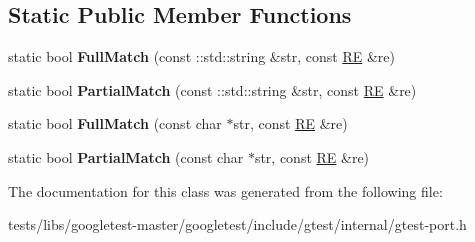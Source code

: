 \subsection*{Static Public Member Functions}
\begin{DoxyCompactItemize}
\item 
\mbox{\label{classtesting_1_1internal_1_1RE_aa79a950758d0f1d62f7762d1e9cefe86}} 
static bool {\bfseries Full\+Match} (const \+::std\+::string \&str, const \hyperlink{classtesting_1_1internal_1_1RE}{RE} \&re)
\item 
\mbox{\label{classtesting_1_1internal_1_1RE_a1e81f9a87211bdca645e025f8f0236c8}} 
static bool {\bfseries Partial\+Match} (const \+::std\+::string \&str, const \hyperlink{classtesting_1_1internal_1_1RE}{RE} \&re)
\item 
\mbox{\label{classtesting_1_1internal_1_1RE_a2b13ec1f6ccd6c32f7efa01e21588f0b}} 
static bool {\bfseries Full\+Match} (const char $\ast$str, const \hyperlink{classtesting_1_1internal_1_1RE}{RE} \&re)
\item 
\mbox{\label{classtesting_1_1internal_1_1RE_a97495dd4c2bb9589522823f060c8e8ba}} 
static bool {\bfseries Partial\+Match} (const char $\ast$str, const \hyperlink{classtesting_1_1internal_1_1RE}{RE} \&re)
\end{DoxyCompactItemize}


The documentation for this class was generated from the following file\+:\begin{DoxyCompactItemize}
\item 
tests/libs/googletest-\/master/googletest/include/gtest/internal/gtest-\/port.\+h\end{DoxyCompactItemize}
